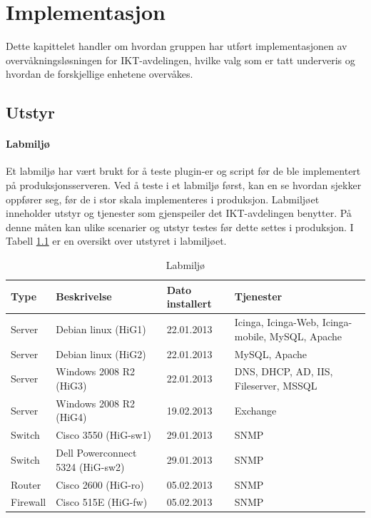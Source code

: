 \chapter{Implementasjon}

Dette kapittelet handler om hvordan gruppen har utført implementasjonen av overvåkningsløsningen for IKT-avdelingen, hvilke valg som er tatt underveris og hvordan de forskjellige enhetene overvåkes.
\section{Utstyr}

\subsubsection{Labmiljø}
Et labmiljø har vært brukt for å teste plugin-er og script før de ble implementert på produksjonsserveren. Ved å teste i et labmiljø først, kan en se hvordan sjekker oppfører seg, før de i stor skala implementeres i produksjon. Labmiljøet inneholder utstyr og tjenester som gjenspeiler det IKT-avdelingen benytter. På denne måten kan ulike scenarier og utstyr testes før dette settes i produksjon. I Tabell \ref{labmiljo} er en oversikt over utstyret i labmiljøet.
\begin{changemargin}{-1cm}{-1cm}
\begin{table}
\begin{center}
\begin{tabular}{ | l | l | l | p{4cm} |} \hline
	\textbf{Type} & \textbf{Beskrivelse} & \textbf{Dato installert} & \textbf{Tjenester} \\ \hline
	Server & Debian linux (HiG1) & 22.01.2013 & Icinga, Icinga-Web, Icinga-mobile, MySQL, Apache \\ \hline
	Server & Debian linux (HiG2) & 22.01.2013 &	MySQL, Apache \\ \hline
	Server & Windows 2008 R2 (HiG3) & 22.01.2013 & DNS, DHCP, AD, IIS, Fileserver, MSSQL \\ \hline
	Server & Windows 2008 R2 (HiG4) & 19.02.2013 & Exchange \\ \hline 
	Switch & Cisco 3550 (HiG-sw1) &	29.01.2013 & SNMP \\ \hline
	Switch & Dell Powerconnect 5324 (HiG-sw2) & 29.01.2013 & SNMP \\ \hline
	Router & Cisco 2600 (HiG-ro) & 05.02.2013 & SNMP \\ \hline 
	Firewall & Cisco 515E (HiG-fw) & 05.02.2013 & SNMP \\ \hline
\end{tabular}
\caption{Labmiljø}
\label{labmiljo}
\end{center}
\end{table}
\end{changemargin}
